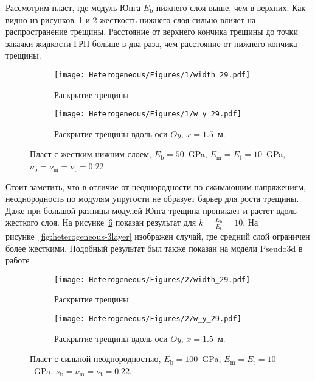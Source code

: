 Рассмотрим пласт, где модуль Юнга $E_\text{b}$ нижнего слоя выше, чем в верхних. Как видно из рисунков~\ref{fig:heterogeneous-2-layer-planar} и \ref{fig:heterogeneous-2-layer-slice} жесткость нижнего слоя сильно влияет на распространение трещины. Расстояние от верхнего кончика трещины до точки закачки жидкости ГРП больше в два раза, чем расстояние от нижнего кончика трещины.
\begin{figure}[htbp]
    \centering
    \begin{subfigure}[t]{0.4\textwidth}
        \centering
        \caption{Раскрытие трещины.}
        \label{fig:heterogeneous-2-layer-planar}
        \texttt{[image: Heterogeneous/Figures/1/width\_29.pdf]}
    \end{subfigure}
    \hfill 
    \begin{subfigure}[t]{0.55\textwidth}
        \centering
        \caption{Раскрытие трещины вдоль оси $Oy$, $x=1.5$~м.}
        \label{fig:heterogeneous-2-layer-slice}
        \texttt{[image: Heterogeneous/Figures/1/w\_y\_29.pdf]}
    \end{subfigure}
    \caption{Пласт с жестким нижним слоем, $E_\text{b} = 50$~GPa, $E_\text{m} = E_\text{t} = 10$~GPa, $\nu_\text{b} = \nu_\text{m} = \nu_\text{t} = 0.22$.}
    \label{fig:heterogeneous-2-layer}
\end{figure}


Стоит заметить, что в отличие от неоднородности по сжимающим напряжениям, неоднородность по модулям упругости не образует барьер для роста трещины. Даже при большой разницы модулей Юнга трещина проникает и растет вдоль жесткого слоя. На рисунке~\ref{fig:heterogeneous-high} показан результат для $k=\frac{E_\text{b}}{E_\text{t}} = 10$. На рисунке~\ref{fig:heterogeneous-3layer} изображен случай, где средний слой ограничен более жесткими. Подобный результат был также показан на модели Pseudo3d в работе~\cite{gu2006}.
\begin{figure}[htbp]
    \centering
    \begin{subfigure}[t]{0.4\textwidth}
        \centering
        \caption{Раскрытие трещины.}
        \label{fig:heterogeneous-high-planar}
        \texttt{[image: Heterogeneous/Figures/2/width\_29.pdf]}
    \end{subfigure}
    \hfill 
    \begin{subfigure}[t]{0.55\textwidth}
        \centering
        \caption{Раскрытие трещины вдоль оси $Oy$, $x=1.5$~м.}
        \label{fig:heterogeneous-high-slice}
        \texttt{[image: Heterogeneous/Figures/2/w\_y\_29.pdf]}
    \end{subfigure}
    \caption{Пласт с сильной неоднородностью, $E_\text{b} = 100$~GPa, $E_\text{m} = E_\text{t} = 10$~GPa, $\nu_\text{b} = \nu_\text{m} = \nu_\text{t} = 0.22$.}
    \label{fig:heterogeneous-high}
\end{figure}


